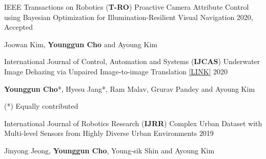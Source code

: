 



\begin{cventries}

  \cventry
    {IEEE Transactions on Robotics (\textbf{T-RO})} %
    {Proactive Camera Attribute Control using Bayesian Optimization for Illumination-Resilient Visual Navigation} %
    { } %
    {2020, Accepted} %
    {
      \begin{cvitems} %
        \item {Joowan Kim, \textbf{Younggun Cho} and Ayoung Kim}
      \end{cvitems}
    }

  \cventry
    {International Journal of Control, Automation and Systems (\textbf{IJCAS})} %
    {Underwater Image Dehazing via Unpaired Image-to-image Translation \href{https://irap.kaist.ac.kr/publications/ycho-2020-ijcas.pdf}{[LINK]}} %
    { } %
    {2020} %
    {
      \begin{cvitems} %
        \item {\textbf{Younggun Cho}*, Hyesu Jang*, Ram Malav, Grurav Pandey and Ayoung Kim}
        \item {(*) Equally contributed}
      \end{cvitems}
    }

  \cventry
    {International Journal of Robotics Research (\textbf{IJRR})} %
    {Complex Urban Dataset with Multi-level Sensors from Highly Diverse Urban Environments} %
    { } %
    {2019} %
    {
      \begin{cvitems} %
        \item {Jinyong Jeong, \textbf{Younggun Cho}, Young-sik Shin and Ayoung Kim}
      \end{cvitems}
    }


\end{cventries}

